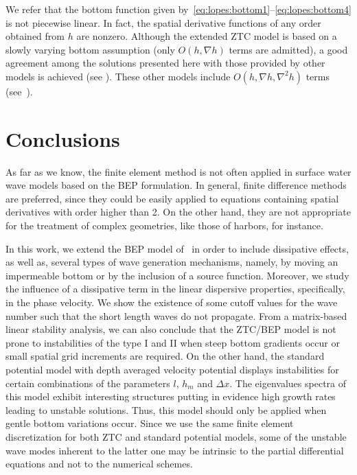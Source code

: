 We refer that the bottom function given
by~\eqref{eq:lopes:bottom1}--\eqref{eq:lopes:bottom4} is not piecewise
linear. In fact, the spatial derivative functions of any order
obtained from $h$ are nonzero. Although the extended ZTC model is
based on a slowly varying bottom assumption (only $O(h,\nabla h)$
terms are admitted), a good agreement among the solutions presented
here with those provided by other models is achieved (see
).  These other models include
$O(h,\nabla h,\nabla^2 h)$ terms (see~\citet{LopesPereiraTrabucho}).

\section{Conclusions}

As far as we know, the finite element method is not often applied in
surface water wave models based on the BEP formulation.  In general,
finite difference methods are preferred, since they could be easily
applied to equations containing spatial derivatives with order higher
than 2.  On the other hand, they are not appropriate for the treatment
of complex geometries, like those of harbors, for instance.

In this work, we extend the BEP model of~\citet{ZhaoTengCheng2004} in
order to include dissipative effects, as well as, several types of
wave generation mechanisms, namely, by moving an impermeable bottom or
by the inclusion of a source function.  Moreover, we study the
influence of a dissipative term in the linear dispersive properties,
specifically, in the phase velocity.  We show the existence of some
cutoff values for the wave number such that the short length waves do
not propagate.  From a matrix-based linear stability analysis, we can
also conclude that the ZTC/BEP model is not prone to instabilities of
the type I and II when steep bottom gradients occur or small spatial
grid increments are required.  On the other hand, the standard
potential model with depth averaged velocity potential displays
instabilities for certain combinations of the parameters $l$, $h_m$
and $\Delta x$. The eigenvalues spectra of this model exhibit
interesting structures putting in evidence high growth rates leading
to unstable solutions. Thus, this model should only be applied when
gentle bottom variations occur.  Since we use the same finite element
discretization for both ZTC and standard potential models, some of the
unstable wave modes inherent to the latter one may be intrinsic to the
partial differential equations and not to the numerical schemes.

